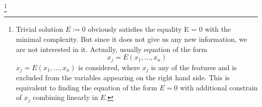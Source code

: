 \documentclass[runningheads]{llncs}
\begin{document}









\footnote{
    \label{foot:eq}
Trivial solution $E:= 0$ obviously satisfies the equality E = 0 with the minimal complexity. 
But since it does not give us any new information, we are not interested in it.
Actually, usually equation of the form 
\begin{equation} \label{eq:ed}
    x_j = E(x_1, ..., x_n)
\end{equation}  
$x_j = E(x_1, ..., x_n)$ is considered, where $x_j$ is any of the features and
is excluded from the variables appearing on the right hand side.
This is equivalent to finding the equation of the form $E = 0$ with additional
constrain of $x_j$ combining linearly in $E$.
}









\cite{kera2023monomialagnostic}


\cite{Diofantos}





% 

\end{document}
